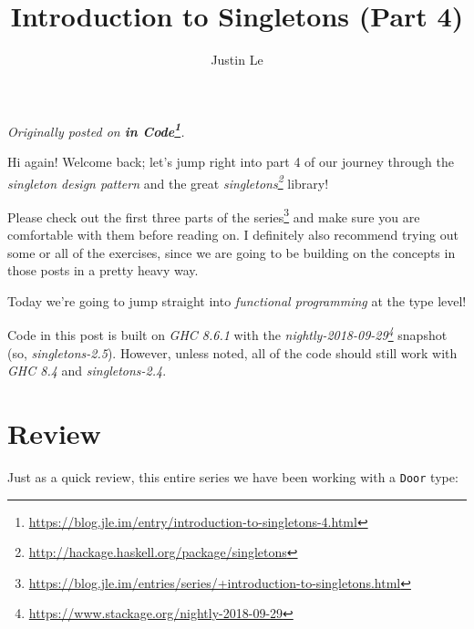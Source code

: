 \documentclass[]{article}
\title{Introduction to Singletons (Part 4)}
\author{Justin Le}
\newenvironment{Shaded}{}{}
\newcommand{\CommentTok}[1]{\textcolor[rgb]{0.38,0.63,0.69}{\textit{#1}}}
\newcommand{\DataTypeTok}[1]{\textcolor[rgb]{0.56,0.13,0.00}{#1}}
\newcommand{\FunctionTok}[1]{\textcolor[rgb]{0.02,0.16,0.49}{#1}}
\newcommand{\KeywordTok}[1]{\textcolor[rgb]{0.00,0.44,0.13}{\textbf{#1}}}
\newcommand{\NormalTok}[1]{#1}
\newcommand{\OtherTok}[1]{\textcolor[rgb]{0.00,0.44,0.13}{#1}}
\renewcommand{\href}[2]{#2\footnote{\url{#1}}}
\begin{document}
\maketitle

\emph{Originally posted on
\textbf{\href{https://blog.jle.im/entry/introduction-to-singletons-4.html}{in
Code}}.}

Hi again! Welcome back; let's jump right into part 4 of our journey through the
\emph{singleton design pattern} and the great
\emph{\href{http://hackage.haskell.org/package/singletons}{singletons}} library!

Please check out
\href{https://blog.jle.im/entries/series/+introduction-to-singletons.html}{the
first three parts of the series} and make sure you are comfortable with them
before reading on. I definitely also recommend trying out some or all of the
exercises, since we are going to be building on the concepts in those posts in a
pretty heavy way.

Today we're going to jump straight into \emph{functional programming} at the
type level!

Code in this post is built on \emph{GHC 8.6.1} with the
\emph{\href{https://www.stackage.org/nightly-2018-09-29}{nightly-2018-09-29}}
snapshot (so, \emph{singletons-2.5}). However, unless noted, all of the code
should still work with \emph{GHC 8.4} and \emph{singletons-2.4}.

\hypertarget{review}{%
\section{Review}\label{review}}

Just as a quick review, this entire series we have been working with a
\texttt{Door} type:

\begin{Shaded}
\end{Shaded}
\end{document}
